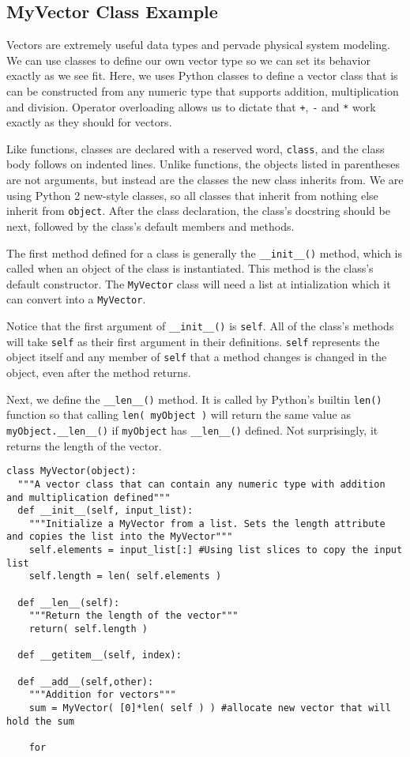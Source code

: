 \subsection{MyVector Class Example}

Vectors are extremely useful data types and pervade physical system modeling. We can use classes to define our own vector type so we can set its behavior exactly as we see fit. Here, we uses Python classes to define a vector class that is can be constructed from any numeric type that supports addition, multiplication and division. Operator overloading allows us to dictate that \verb|+|, \verb|-| and \verb|*| work exactly as they should for vectors.

Like functions, classes are declared with a reserved word, \verb|class|, and the class body follows on indented lines. Unlike functions, the objects listed in parentheses are not arguments, but instead are the classes the new class inherits from. We are using Python 2 new-style classes, so all classes that inherit from nothing else inherit from \verb|object|. After the class declaration, the class's docstring should be next, followed by the class's default members and methods.

The first method defined for a class is generally the \verb|__init__()| method, which is called when an object of the class is instantiated. This method is the class's default constructor. The \verb|MyVector| class will need a list at intialization which it can convert into a \verb|MyVector|.

Notice that the first argument of \verb|__init__()| is \verb|self|. All of the class's methods will take \verb|self| as their first argument in their definitions. \verb|self| represents the object itself and any member of \verb|self| that a method changes is changed in the object, even after the method returns.

Next, we define the \verb|__len__()| method. It is called by Python's builtin \verb|len()| function so that calling \verb|len( myObject )| will return the same value as \verb|myObject.__len__()| if \verb|myObject| has \verb|__len__()| defined. Not surprisingly, it returns the length of the vector.



\begin{lstlisting}[caption=MyVector class,
  label=myvector,
  float=h!]
class MyVector(object):
  """A vector class that can contain any numeric type with addition and multiplication defined"""
  def __init__(self, input_list):
    """Initialize a MyVector from a list. Sets the length attribute and copies the list into the MyVector"""
    self.elements = input_list[:] #Using list slices to copy the input list
    self.length = len( self.elements )

  def __len__(self):
    """Return the length of the vector"""
    return( self.length )

  def __getitem__(self, index):

  def __add__(self,other):
    """Addition for vectors"""
    sum = MyVector( [0]*len( self ) ) #allocate new vector that will hold the sum

    for
\end{lstlisting}

